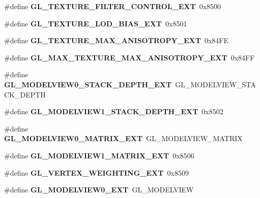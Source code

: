 \begin{DoxyCompactItemize}
\item 
\#define {\bfseries G\+L\+\_\+\+T\+E\+X\+T\+U\+R\+E\+\_\+\+F\+I\+L\+T\+E\+R\+\_\+\+C\+O\+N\+T\+R\+O\+L\+\_\+\+E\+X\+T}~0x8500\label{_s_d_l__opengl_8h_afe93fba1ee48590f7c4be6144e97bae4}

\item 
\#define {\bfseries G\+L\+\_\+\+T\+E\+X\+T\+U\+R\+E\+\_\+\+L\+O\+D\+\_\+\+B\+I\+A\+S\+\_\+\+E\+X\+T}~0x8501\label{_s_d_l__opengl_8h_ada8467789b03ea2ef0ec9cdfca65877a}

\item 
\#define {\bfseries G\+L\+\_\+\+T\+E\+X\+T\+U\+R\+E\+\_\+\+M\+A\+X\+\_\+\+A\+N\+I\+S\+O\+T\+R\+O\+P\+Y\+\_\+\+E\+X\+T}~0x84\+F\+E\label{_s_d_l__opengl_8h_a00b65957cb070504d8e364031b176737}

\item 
\#define {\bfseries G\+L\+\_\+\+M\+A\+X\+\_\+\+T\+E\+X\+T\+U\+R\+E\+\_\+\+M\+A\+X\+\_\+\+A\+N\+I\+S\+O\+T\+R\+O\+P\+Y\+\_\+\+E\+X\+T}~0x84\+F\+F\label{_s_d_l__opengl_8h_ad1cf646d8224fdedcce963d095f71c1b}

\item 
\#define {\bfseries G\+L\+\_\+\+M\+O\+D\+E\+L\+V\+I\+E\+W0\+\_\+\+S\+T\+A\+C\+K\+\_\+\+D\+E\+P\+T\+H\+\_\+\+E\+X\+T}~G\+L\+\_\+\+M\+O\+D\+E\+L\+V\+I\+E\+W\+\_\+\+S\+T\+A\+C\+K\+\_\+\+D\+E\+P\+T\+H\label{_s_d_l__opengl_8h_a1e220d5d86161de155620c3dcc6a71bf}

\item 
\#define {\bfseries G\+L\+\_\+\+M\+O\+D\+E\+L\+V\+I\+E\+W1\+\_\+\+S\+T\+A\+C\+K\+\_\+\+D\+E\+P\+T\+H\+\_\+\+E\+X\+T}~0x8502\label{_s_d_l__opengl_8h_adc8e6c9fdc62d6a62a7f87c3e652d13c}

\item 
\#define {\bfseries G\+L\+\_\+\+M\+O\+D\+E\+L\+V\+I\+E\+W0\+\_\+\+M\+A\+T\+R\+I\+X\+\_\+\+E\+X\+T}~G\+L\+\_\+\+M\+O\+D\+E\+L\+V\+I\+E\+W\+\_\+\+M\+A\+T\+R\+I\+X\label{_s_d_l__opengl_8h_a180959316973cf5e7282cf14f59c7bec}

\item 
\#define {\bfseries G\+L\+\_\+\+M\+O\+D\+E\+L\+V\+I\+E\+W1\+\_\+\+M\+A\+T\+R\+I\+X\+\_\+\+E\+X\+T}~0x8506\label{_s_d_l__opengl_8h_ad52e7281fe368e52ee4ab32fff23e091}

\item 
\#define {\bfseries G\+L\+\_\+\+V\+E\+R\+T\+E\+X\+\_\+\+W\+E\+I\+G\+H\+T\+I\+N\+G\+\_\+\+E\+X\+T}~0x8509\label{_s_d_l__opengl_8h_a790db2025ca25cf2264deba59e9a4039}

\item 
\#define {\bfseries G\+L\+\_\+\+M\+O\+D\+E\+L\+V\+I\+E\+W0\+\_\+\+E\+X\+T}~G\+L\+\_\+\+M\+O\+D\+E\+L\+V\+I\+E\+W\label{_s_d_l__opengl_8h_af791b79963f830c7c6e3f899e384bcb4}


\end{DoxyCompactItemize}
